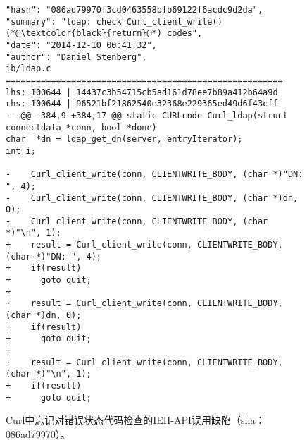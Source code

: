 \begin{figure}[t]
	\centering
\begin{lstlisting}
"hash": "086ad79970f3cd0463558bfb69122f6acdc9d2da",
"summary": "ldap: check Curl_client_write() (*@\textcolor{black}{return}@*) codes",
"date": "2014-12-10 00:41:32",
"author": "Daniel Stenberg",
ib/ldap.c
=======================================================
lhs: 100644 | 14437c3b54715cb5ad161d78ee7b89a412b64a9d
rhs: 100644 | 96521bf21862540e32368e229365ed49d6f43cff
---@@ -384,9 +384,17 @@ static CURLcode Curl_ldap(struct connectdata *conn, bool *done)
char  *dn = ldap_get_dn(server, entryIterator);
int i;

-    Curl_client_write(conn, CLIENTWRITE_BODY, (char *)"DN: ", 4);
-    Curl_client_write(conn, CLIENTWRITE_BODY, (char *)dn, 0);
-    Curl_client_write(conn, CLIENTWRITE_BODY, (char *)"\n", 1);
+    result = Curl_client_write(conn, CLIENTWRITE_BODY, (char *)"DN: ", 4);
+    if(result)
+      goto quit;
+
+    result = Curl_client_write(conn, CLIENTWRITE_BODY, (char *)dn, 0);
+    if(result)
+      goto quit;
+
+    result = Curl_client_write(conn, CLIENTWRITE_BODY, (char *)"\n", 1);
+    if(result)
+      goto quit;

\end{lstlisting}
	\caption{
	Curl中忘记对错误状态代码检查的IEH-API误用缺陷（sha：086ad79970）。
	}
	\label{fig:2-3-ieh-1}
\end{figure}
